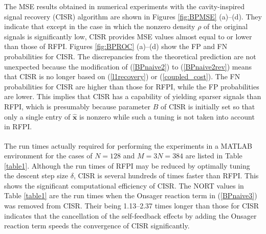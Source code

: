 \documentclass[12pt]{iopart}
\newcommand{\vm}[1]{\boldsymbol{#1}}
\begin{document}
The MSE results obtained in numerical experiments with the cavity-inspired signal recovery (CISR) algorithm are shown in Figures \ref{fig:BPMSE} (a)--(d). They indicate that except in the case in which the nonzero density $\rho$ of the original signals is significantly low, 
CISR provides MSE values almost equal to or lower than those of RFPI. 
Figures \ref{fig:BPROC} (a)--(d) show the FP and FN probabilities for CISR. The discrepancies from the theoretical prediction are not unexpected because the modification of (\ref{BPnaive2}) to (\ref{BPnaive2rev}) means that CISR is no longer based on (\ref{l1recovery}) or (\ref{coupled_cost}). The FN probabilities for CISR are higher than those for RFPI, while the FP probabilities are lower. This implies that CISR has a capability of yielding sparser signals than RFPI, which is presumably because parameter $B$ of CISR is initially set so that only a single entry of $\hat{\vm{x}}$ is nonzero while such a tuning is not taken into account in RFPI. 

The run times actually required for performing the experiments in a MATLAB\textsuperscript{\textregistered} environment for the cases of $N=128$ and $M=3N=384$ are listed in Table \ref{table1}. Although the run times of RFPI may be reduced by optimally tuning the descent step size $\delta$, CISR is several hundreds of times faster than RFPI. This shows the significant computational efficiency of CISR. The NORT values in Table \ref{table1} are the run times when the Onsager reaction term in (\ref{BPnaive3}) was removed from CISR. Their being 1.13--2.37 times longer than those for CISR indicates that the cancellation of the self-feedback effects by adding the Onsager reaction term speeds the convergence of CISR significantly. 
\end{document}
